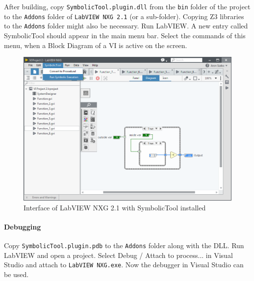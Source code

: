 After building, copy \verb|SymbolicTool.plugin.dll| from the \verb|bin| folder of the project to the \verb|Addons| folder of \verb|LabVIEW NXG 2.1| (or a sub-folder). Copying Z3 libraries to the \verb|Addons| folder might also be necessary. Run LabVIEW. A new entry called SymbolicTool should appear in the main menu bar. Select the commands of this menu, when a Block Diagram of a VI is active on the screen.
\begin{figure}
\centering
\includegraphics[width=150mm,keepaspectratio]{figures/interface.png}
\caption{Interface of LabVIEW NXG 2.1 with SymbolicTool installed} 
\label{fig:interface1}
\end{figure}

\paragraph{Debugging} Copy \verb|SymbolicTool.plugin.pdb| to the \verb|Addons| folder along with the DLL. Run LabVIEW and open a project. Select Debug / Attach to process... in Visual Studio and attach to \verb|LabVIEW NXG.exe|. Now the debugger in Visual Studio can be used.
